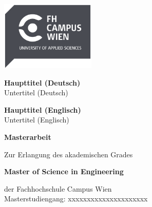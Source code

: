 \begin{titlepage}
  \sffamily
  \includegraphics[width=4.5cm]{figures/FH_Campus_Wien_Logo.pdf}

  \center

  \vspace{-0.5cm}

  \hspace*{-1.0cm} {\LARGE \textbf{Haupttitel (Deutsch)\\}}
  \vspace{0.2cm}
  \hspace*{-1.0cm} Untertitel (Deutsch) \\

  \vspace{1cm}

  \hspace*{-1.0cm} {\LARGE \textbf{Haupttitel (Englisch)\\}}
  \vspace{0.2cm}
  \hspace*{-1.0cm} Untertitel (Englisch) \\

  \vspace{2.7cm}

  \hspace*{-1.0cm} {\LARGE \textbf{Masterarbeit\\}}

  \vspace{0.65cm}

  \hspace*{-1.0cm} Zur Erlangung des akademischen Grades \\

  \vspace{0.65cm}

  \hspace*{-1.0cm} \textbf{Master of Science in Engineering\\}

  \vspace{0.65cm}

  \hspace*{-1.0cm} der Fachhochschule Campus Wien \\
  \vspace{0.2cm}
  \hspace*{-1.0cm} Masterstudiengang: xxxxxxxxxxxxxxxxxxxxx \\


\end{titlepage}
